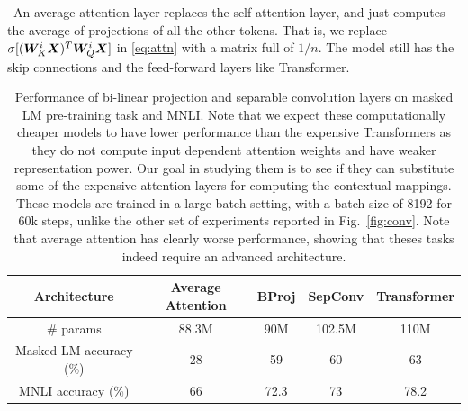 ~An average attention layer replaces the self-attention layer, and just computes the average of projections of all the other tokens. That is, we replace $\sigma [({\bm{W}}_K^i {\bm{X}})^T {\bm{W}}_Q^i {\bm{X}}]$ in \eqref{eq:attn} with a matrix full of $1/n$. The model still has the skip connections and the feed-forward layers like Transformer. 

\begin{table}[!t]
\centering
\begin{tabular}{|c| c c c c|} 
 \hline
 Architecture & Average Attention & {\rm BProj} & {\rm SepConv} & Transformer \\ [0.5ex] 
 \hline
  \# params & 88.3M & 90M  & 102.5M & 110M \\
 \hline
 Masked LM accuracy (\%)& 28 & 59 & 60 & 63 \\
 \hline
 MNLI accuracy (\%)& 66 & 72.3 & 73 & 78.2 \\
 \hline
\end{tabular}
\vspace{1ex}
\caption{Performance of bi-linear projection and separable convolution layers on masked LM pre-training task and MNLI. Note that we expect these computationally cheaper models to have lower performance than the expensive Transformers as they do not compute input dependent attention weights and have weaker representation power. Our goal in studying them is to see if they can substitute some of the expensive attention layers for computing the contextual mappings. These models are trained in a large batch setting, with a batch size of 8192 for 60k steps, unlike the other set of experiments reported in Fig.~\ref{fig:conv}. Note that average attention has clearly worse performance, showing that theses tasks indeed require an advanced architecture.}
\label{table:large_batch}
\end{table}